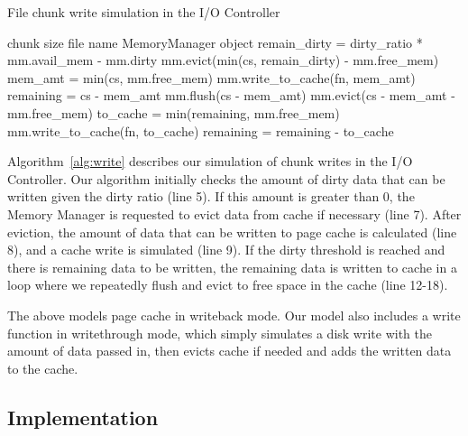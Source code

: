 \documentclass[conference]{IEEEtran}
\newcommand{\Desc}[2]{\State \makebox[2em][l]{#1}#2}
\begin{document}
    \begin{algorithm}\caption{File chunk write simulation in the I/O Controller}
    \label{alg:write}
        \small
        \begin{algorithmic}[1]
            \Input
                \Desc{cs}{chunk size}
                \Desc{fn}{file name}
                \Desc{mm}{MemoryManager object}
               \EndInput
            \State remain\_dirty = dirty\_ratio * mm.avail\_mem - mm.dirty
             
                \State mm.evict(min(cs, remain\_dirty) - mm.free\_mem)
                \State mem\_amt = min(cs, mm.free\_mem)
                \State mm.write\_to\_cache(fn, mem\_amt)
            \EndIf
            \State remaining = cs - mem\_amt
              
                \State mm.flush(cs - mem\_amt)
                \State mm.evict(cs - mem\_amt  - mm.free\_mem)
                \State to\_cache = min(remaining, mm.free\_mem)
                \State mm.write\_to\_cache(fn, to\_cache)
                \State remaining = remaining - to\_cache
            \EndWhile

        \end{algorithmic}
    \end{algorithm}
    Algorithm~\ref{alg:write} describes our simulation of chunk writes in
    the I/O Controller.
    Our algorithm initially checks the  amount of dirty data that
    can be written given the dirty ratio (line 5).
    If this amount is greater than 0, the Memory Manager is requested to evict
    data from cache if necessary (line 7).
    After eviction, the amount of data that can be written to
    page cache is calculated (line 8), and a cache write is simulated (line 9).
    If the dirty threshold is reached and there is remaining data to be written,
    the remaining data is written to cache in a loop
    where we repeatedly flush and evict to free space in the cache (line 12-18).

    The above models page cache in writeback
    mode. Our model also includes a write function in writethrough mode,
    which simply simulates a disk write with the amount of data passed in,
    then evicts cache if needed and adds the written data to the cache.

        \subsection{Implementation}
\end{document}
